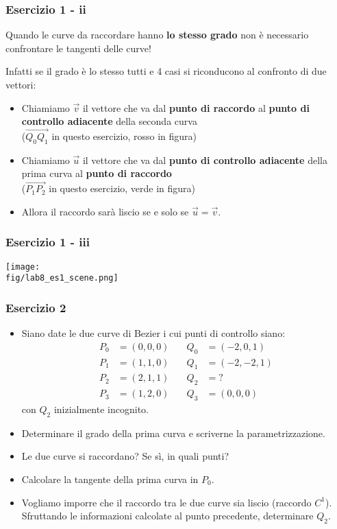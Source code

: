 \documentclass{beamer}
\newcommand{\fig}{./figures} %
\begin{document}
\begin{frame}
\frametitle{Esercizio 1 - ii}
        Quando le curve da raccordare hanno \textbf{lo stesso grado} non \`e necessario confrontare le tangenti delle curve!
        \vspace{0.5cm}

        Infatti se il grado \`e lo stesso tutti e 4 casi si riconducono al confronto di due vettori:
    \begin{itemize}
        \item Chiamiamo $\overrightarrow v$ il vettore che va dal \textbf{punto di raccordo} al \textbf{punto di controllo adiacente} della seconda curva\\
            ($\overrightarrow{Q_0 Q_1}$ in questo esercizio, rosso in figura)
        \item Chiamiamo $\overrightarrow u$ il vettore che va dal \textbf{punto di controllo adiacente} della prima curva al \textbf{punto di raccordo}\\
            ($\overrightarrow{P_1 P_2}$ in questo esercizio, verde in figura)
        \item Allora il raccordo sar\`a liscio se e solo se $\overrightarrow u = \overrightarrow v$.

    \end{itemize}
\end{frame}

\begin{frame}
\frametitle{Esercizio 1 - iii}
\begin{center}
\texttt{[image: \\fig/lab8\_es1\_scene.png]}
\end{center}
\end{frame}


\begin{frame}
\frametitle{Esercizio 2}
\begin{itemize}
\item Siano date le due curve di Bezier i cui punti di controllo siano:
\begin{align*}
    P_0 &= (0,0,0) \quad & Q_0 &= (-2, 0, 1)\\
    P_1 &= (1,1,0) \quad & Q_1 &= (-2, -2, 1)\\
    P_2 &= (2,1,1) \quad & Q_2 &= ? \\
    P_3 &= (1,2,0) \quad & Q_3 &= (0, 0, 0)
\end{align*}
con $Q_2$ inizialmente incognito.
\item Determinare il grado della prima curva e scriverne la parametrizzazione.
\item Le due curve si raccordano? Se s\`i, in quali punti?
\item Calcolare la tangente della prima curva in $P_0$.
\item Vogliamo imporre che il raccordo tra le due curve sia liscio (raccordo $C^1$). Sfruttando le informazioni calcolate al punto precedente,
    determinare $Q_2$.
\end{itemize}
\end{frame}
\end{document}
